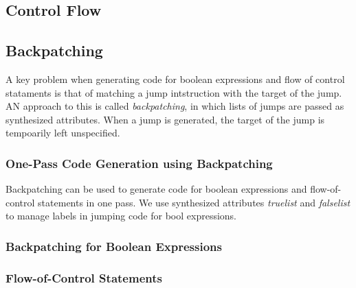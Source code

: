 \documentclass{article}
\begin{document}

\subsection{Control Flow} %
\label{sub:Control Flow}


\subsection{Backpatching} %
\label{sub:Backpatching}
A key problem when generating code for boolean expressions and flow of control stataments is that of matching a jump intstruction with the target of the jump. AN approach to this is called \emph{backpatching}, in which lists of jumps are passed as synthesized attributes. When a jump is generated, the target of the jump is tempoarily left unspecified.

\subsubsection{One-Pass Code Generation using Backpatching} %
\label{ssub:One-Pass Code Generation using Backpatching}
Backpatching can be used to generate code for boolean expressions and flow-of-control statements in one pass. We use synthesized attributes \emph{truelist} and \emph{falselist} to manage labels in jumping code for bool expressions.

\subsubsection{Backpatching for Boolean Expressions} %
\label{ssub:Backpatching for Boolean Expressions}


\subsubsection{Flow-of-Control Statements} %
\label{ssub:Flow-of-Control Statements}



\end{document}
